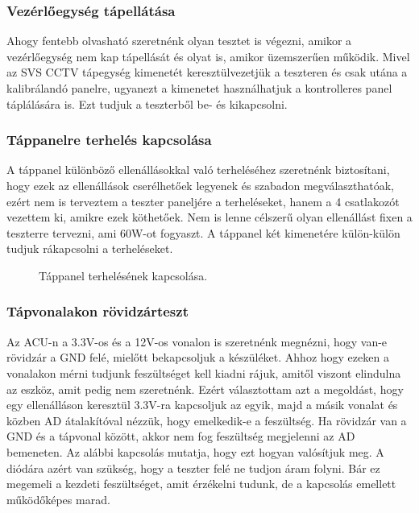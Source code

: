 \documentclass[a4paper, 12pt]{article}
\newcommand{\tab}{\hspace*{1em}}
\begin{document}
\subsubsection{Vezérlőegység tápellátása}
\tab Ahogy fentebb olvasható szeretnénk olyan tesztet is végezni, amikor a vezérlőegység nem kap tápellását és olyat is, amikor üzemszerűen működik. Mivel az SVS CCTV tápegység kimenetét keresztülvezetjük a teszteren és csak utána a kalibrálandó panelre, ugyanezt a kimenetet használhatjuk a kontrolleres panel táplálására is. Ezt tudjuk a teszterből be- és kikapcsolni.

\subsubsection{Táppanelre terhelés kapcsolása}
A táppanel különböző ellenállásokkal való terheléséhez szeretnénk biztosítani, hogy ezek az ellenállások cserélhetőek legyenek és szabadon megválaszthatóak, ezért nem is terveztem a teszter paneljére a terheléseket, hanem a 4 csatlakozót vezettem ki, amikre ezek köthetőek. Nem is lenne célszerű olyan ellenállást fixen a teszterre tervezni, ami 60W-ot fogyaszt. A táppanel két kimenetére külön-külön tudjuk rákapcsolni a terheléseket.
\begin{figure}[H]
    \centering
    \caption{Táppanel terhelésének kapcsolása.}
\end{figure}

\subsubsection{Tápvonalakon rövidzárteszt}
Az ACU-n a 3.3V-os és a 12V-os vonalon is szeretnénk megnézni, hogy van-e rövidzár a GND felé, mielőtt bekapcsoljuk a készüléket. Ahhoz hogy ezeken a vonalakon mérni tudjunk feszültséget kell kiadni rájuk, amitől viszont elindulna az eszköz, amit pedig nem szeretnénk. Ezért választottam azt a megoldást, hogy egy ellenálláson keresztül 3.3V-ra kapcsoljuk az egyik, majd a másik vonalat és közben AD átalakítóval nézzük, hogy emelkedik-e a feszültség. Ha rövidzár van a GND és a tápvonal között, akkor nem fog feszültség megjelenni az AD bemeneten. Az alábbi kapcsolás mutatja, hogy ezt hogyan valósítjuk meg. A diódára azért van szükség, hogy a teszter felé ne tudjon áram folyni. Bár ez megemeli a kezdeti feszültséget, amit érzékelni tudunk, de a kapcsolás emellett működőképes marad.
\end{document}
